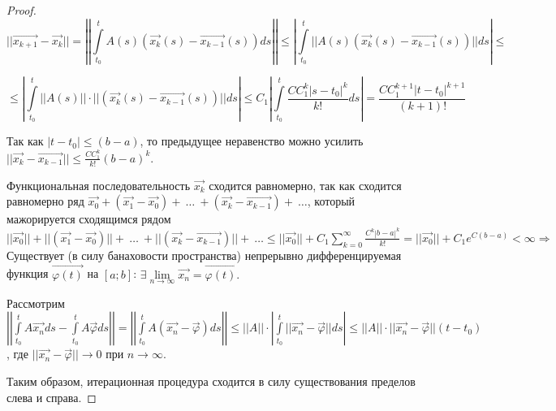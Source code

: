 \begin{proof}
\[ || \overrightarrow{x_{k+1}} - \overrightarrow{x_{k}} || = \left| \left| \int\limits_{t_0}^{t} A(s)(\overrightarrow{x_k}(s) - \overrightarrow{x_{k-1}}(s))ds \right| \right| \leqslant \left| \int\limits_{t_0}^{t} ||A(s)(\overrightarrow{x_k}(s) - \overrightarrow{x_{k-1}}(s))|| ds \right| \leqslant \]

\[ \leqslant \left| \int\limits_{t_0}^{t} ||A(s)||\cdot ||(\overrightarrow{x_k}(s) - \overrightarrow{x_{k-1}}(s))|| ds \right| \leqslant C_1 \left| \int\limits_{t_0}^{t} \frac{CC_1^k|s-t_0|^k}{k!}ds \right| = \frac{CC_1^{k+1}|t-t_0|^{k+1}}{(k+1)!} \]

Так как $|t-t_0| \leqslant (b-a)$, то предыдущее неравенство можно усилить $||\overrightarrow{x_k} - \overrightarrow{x_{k-1}}|| \leqslant \frac{CC_1^k}{k!}(b-a)^k.$

Функциональная последовательность $\overrightarrow{x_k}$ сходится равномерно, так как сходится равномерно ряд $\overrightarrow{x_0} + (\overrightarrow{x_1} - \overrightarrow{x_0}) +\ \dots\ +(\overrightarrow{x_k} - \overrightarrow{x_{k-1}}) +\ \dots$, который мажорируется сходящимся рядом $||\overrightarrow{x_0}|| + ||(\overrightarrow{x_1} - \overrightarrow{x_0})|| +\ \dots\ + ||(\overrightarrow{x_k} - \overrightarrow{x_{k-1}})|| +\ \dots \leqslant ||\overrightarrow{x_0}|| + C_1\sum\limits_{k = 0}^{\infty}\frac{C^k|b-a|^k}{k!} = ||\overrightarrow{x_0}|| + C_1 e^{C(b-a)} < \infty \Rightarrow$ Существует (в силу банаховости пространства) непрерывно дифференцируемая функция $\overrightarrow{\varphi(t)}$ на $[a;b]$: $\exists \lim\limits_{n \rightarrow \infty} \overrightarrow{x_n} = \overrightarrow{\varphi(t)}.$

Рассмотрим $\left| \left| \int\limits_{t_0}^{t} A\overrightarrow{x_n}ds - \int\limits_{t_0}^{t} A\overrightarrow{\varphi} ds \right| \right| = \left| \left| \int\limits_{t_0}^{t} A(\overrightarrow{x_n} - \overrightarrow{\varphi})ds \right| \right| \leqslant ||A||\cdot \left| \int\limits_{t_0}^{t} ||\overrightarrow{x_n} - \overrightarrow{\varphi}|| ds \right| \leqslant ||A|| \cdot ||\overrightarrow{x_n} - \overrightarrow{\varphi}|| (t - t_0)$, где $||\overrightarrow{x_n} - \overrightarrow{\varphi} || \rightarrow 0$ при $n \rightarrow \infty$.

Таким образом, итерационная процедура сходится в силу существования пределов слева и справа.


\end{proof}
